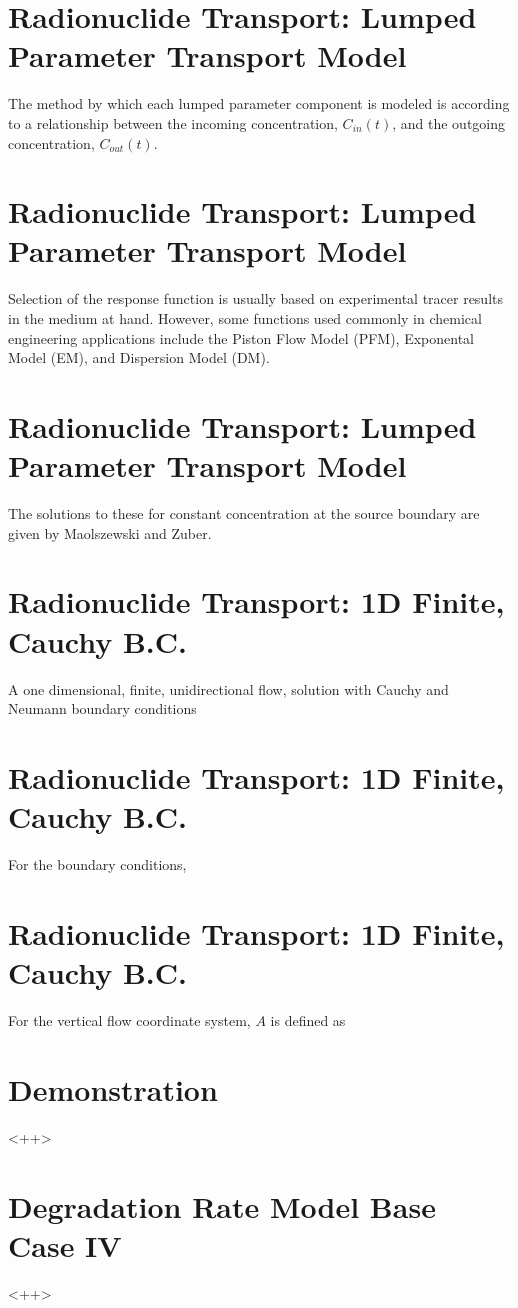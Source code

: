 \documentclass[letterpaper]{article}
\begin{document}
{  \section{Radionuclide Transport: Lumped Parameter Transport Model}
The method by which each lumped parameter component is modeled is
according to a relationship between the incoming concentration, $C_{in}(t)$,
and the outgoing concentration, $C_{out}(t)$.

  \section{Radionuclide Transport: Lumped Parameter Transport Model}
Selection of the response function is usually based on experimental tracer
results in the medium at hand. However, some functions used commonly in
chemical engineering applications \cite{maloszewski_lumped_1996} include the
Piston Flow Model (PFM), Exponental Model (EM), and Dispersion Model (DM). 

  \section{Radionuclide Transport: Lumped Parameter Transport Model}
The solutions to these for constant concentration at the 
source boundary are given by Maolszewski and Zuber.

  \section{Radionuclide Transport: 1D Finite, Cauchy B.C.}
  A one dimensional, finite, unidirectional flow,
  solution with Cauchy and Neumann boundary conditions

  \section{Radionuclide Transport: 1D Finite, Cauchy B.C.}
For the boundary conditions, 

  \section{Radionuclide Transport: 1D Finite, Cauchy B.C.}
For the vertical flow coordinate system, $A$ is defined as

\section{Demonstration}
<++>
\section{Degradation Rate Model Base Case IV}
<++>
}
\end{document}
